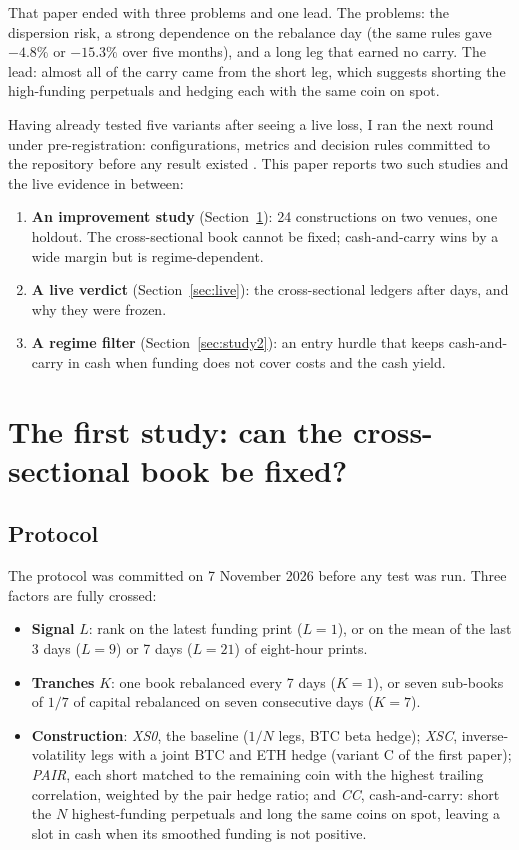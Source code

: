 \documentclass[11pt,a4paper]{article}
\begin{document}
That paper ended with three problems and one lead. The problems: the dispersion risk,
a strong dependence on the rebalance day (the same rules gave $-4.8\%$ or $-15.3\%$
over five months), and a long leg that earned no carry. The lead: almost all of the
carry came from the short leg, which suggests shorting the high-funding perpetuals and
hedging each with the same coin on spot.

Having already tested five variants after seeing a live loss, I ran the next round
under pre-registration: configurations, metrics and decision rules committed to the
repository before any result existed \cite{harvey2016cross}. This paper reports two such
studies and the live evidence in between:

\begin{enumerate}
  \item \textbf{An improvement study} (Section~\ref{sec:study1}): 24 constructions on
  two venues, one holdout. The cross-sectional book cannot be fixed; cash-and-carry
  wins by a wide margin but is regime-dependent.
  \item \textbf{A live verdict} (Section~\ref{sec:live}): the cross-sectional ledgers
  after \LiveDays{} days, and why they were frozen.
  \item \textbf{A regime filter} (Section~\ref{sec:study2}): an entry hurdle that keeps
  cash-and-carry in cash when funding does not cover costs and the cash yield.
\end{enumerate}

\section{The first study: can the cross-sectional book be fixed?}\label{sec:study1}

\subsection{Protocol}

The protocol was committed on 7 November 2026 before any test was run. Three factors
are fully crossed:

\begin{itemize}
  \item \textbf{Signal} $L$: rank on the latest funding print ($L=1$), or on the mean
  of the last 3 days ($L=9$) or 7 days ($L=21$) of eight-hour prints.
  \item \textbf{Tranches} $K$: one book rebalanced every 7 days ($K=1$), or seven
  sub-books of $1/7$ of capital rebalanced on seven consecutive days ($K=7$).
  \item \textbf{Construction}: \emph{XS0}, the baseline ($1/N$ legs, BTC beta hedge);
  \emph{XSC}, inverse-volatility legs with a joint BTC and ETH hedge (variant C of the
  first paper); \emph{PAIR}, each short matched to the remaining coin with the highest
  trailing correlation, weighted by the pair hedge ratio; and \emph{CC}, cash-and-carry:
  short the $N$ highest-funding perpetuals and long the same coins on spot, leaving a
  slot in cash when its smoothed funding is not positive.
\end{itemize}
\end{document}
